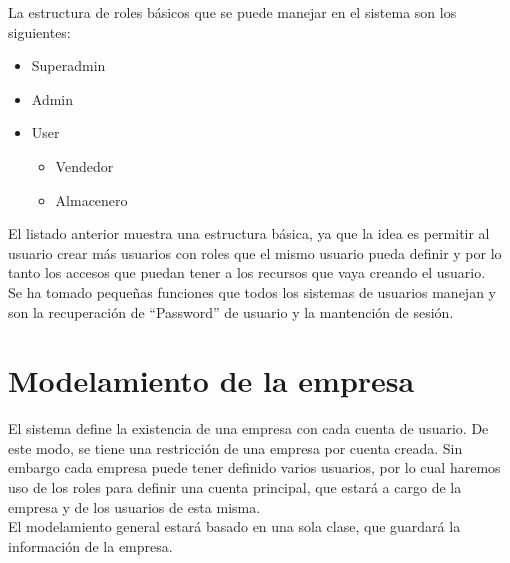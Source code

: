 La estructura de roles básicos que se puede manejar en el sistema son los siguientes:

\begin{itemize}
\item Superadmin
\item Admin
\item User
\begin{itemize}
\item Vendedor
\item Almacenero
\end{itemize}
\end{itemize}

El listado anterior muestra una estructura básica, ya que la idea es permitir al usuario crear más usuarios con roles que el mismo usuario pueda definir y por lo tanto los accesos que puedan tener a los recursos que vaya creando el usuario.\\

Se ha tomado pequeñas funciones que todos los sistemas de usuarios manejan y son la recuperación de “Password” de usuario y la mantención de sesión.

\section{Modelamiento de la empresa}

El sistema define la existencia de una empresa con cada cuenta de usuario. De este modo, se tiene una restricción de una empresa por cuenta creada. Sin embargo cada empresa puede tener definido varios usuarios, por lo cual haremos uso de los roles para definir una cuenta principal, que estará a cargo de la empresa y de los usuarios de esta misma.\\

El modelamiento general estará basado en una sola clase, que guardará la información de la empresa.\\

